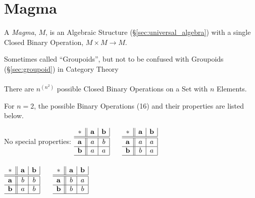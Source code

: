 


\section{Magma}\label{sec:magma}

A \emph{Magma}, $M$, is an Algebraic Structure (\S\ref{sec:universal_algebra})
with a single Closed Binary Operation, $M \times M \rightarrow M$.

\fist Sometimes called ``Groupoids'', but not to be confused with Groupoids
(\S\ref{sec:groupoid}) in Category Theory
\\ \\

There are $n^(n^2)$ possible Closed Binary Operations on a Set with $n$
Elements.

For $n=2$, the possible Binary Operations (16) and their properties are listed
below.

No special properties:
$\begin{array}{c||c|c|}
  * & \mathbf{a} & \mathbf{b} \\ \hline \hline
  \mathbf{a} & a & b \\ \hline
  \mathbf{b} & a & a \\ \hline
\end{array}$ $\quad$ $\begin{array}{c||c|c|}
  * & \mathbf{a} & \mathbf{b} \\ \hline \hline
  \mathbf{a} & a & a \\ \hline
  \mathbf{b} & b & a \\ \hline
\end{array}$ \\ \hfill \\

$\begin{array}{c||c|c|}
  * & \mathbf{a} & \mathbf{b} \\ \hline \hline
  \mathbf{a} & b & b \\ \hline
  \mathbf{b} & a & b \\ \hline
\end{array}$ $\quad$ $\begin{array}{c||c|c|}
  * & \mathbf{a} & \mathbf{b} \\ \hline \hline
  \mathbf{a} & b & a \\ \hline
  \mathbf{b} & b & b \\ \hline
\end{array}$ \\ \hfill \\

